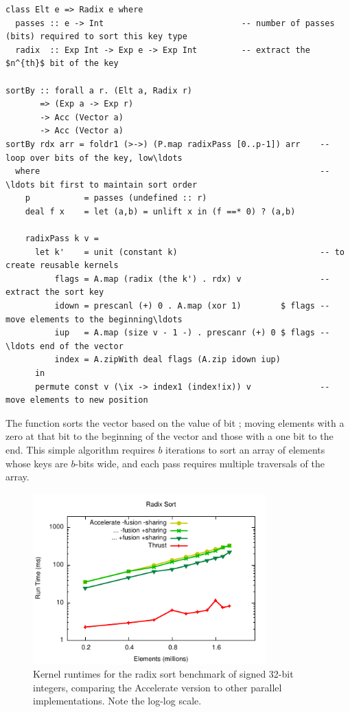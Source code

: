 \begin{lstlisting}[style=haskell
    ,float
    ,label=lst:radixsort
    ,caption={Radix sort algorithm in Accelerate}]
class Elt e => Radix e where
  passes :: e -> Int                            -- number of passes (bits) required to sort this key type
  radix  :: Exp Int -> Exp e -> Exp Int         -- extract the $n^{th}$ bit of the key

sortBy :: forall a r. (Elt a, Radix r)
       => (Exp a -> Exp r)
       -> Acc (Vector a)
       -> Acc (Vector a)
sortBy rdx arr = foldr1 (>->) (P.map radixPass [0..p-1]) arr    -- loop over bits of the key, low\ldots
  where                                                         -- \ldots bit first to maintain sort order
    p           = passes (undefined :: r)
    deal f x    = let (a,b) = unlift x in (f ==* 0) ? (a,b)

    radixPass k v =
      let k'    = unit (constant k)                             -- to create reusable kernels
          flags = A.map (radix (the k') . rdx) v                -- extract the sort key
          idown = prescanl (+) 0 . A.map (xor 1)        $ flags -- move elements to the beginning\ldots
          iup   = A.map (size v - 1 -) . prescanr (+) 0 $ flags -- \ldots end of the vector
          index = A.zipWith deal flags (A.zip idown iup)
      in
      permute const v (\ix -> index1 (index!ix)) v              -- move elements to new position
\end{lstlisting}

The  function sorts the vector  based on the value of
bit ; moving elements with a zero at that bit to the beginning of the
vector and those with a one bit to the end. This simple algorithm requires
$b$ iterations to sort an array of elements whose keys are $b$-bits wide, and
each pass requires multiple traversals of the array.

\begin{figure}
    \begin{center}
        \includegraphics[width=0.8\textwidth]{images/sec-6/radixsort/radixsort}
    \end{center}
    \caption[Radix sort kernel benchmarks]{Kernel runtimes for the radix sort benchmark
        of signed 32-bit integers, comparing the Accelerate version to other
        parallel implementations. Note the log-log scale.}
    \label{fig:radixsort}
\end{figure}

